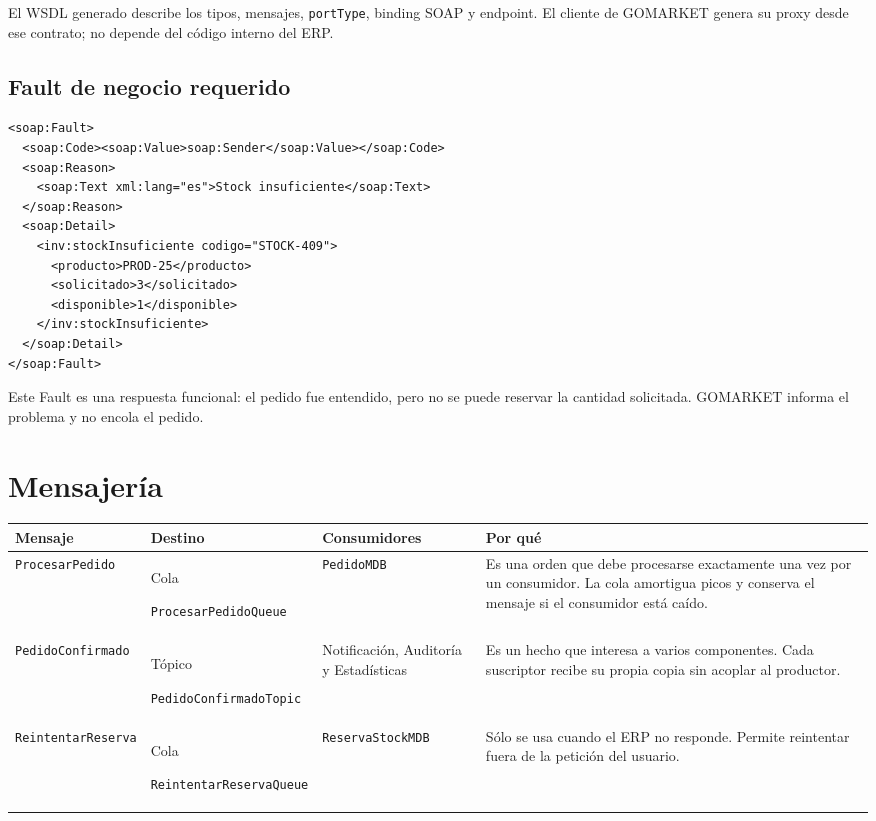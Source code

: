 \documentclass[11pt,a4paper]{article}
\begin{document}
El WSDL generado describe los tipos, mensajes, \texttt{portType}, binding SOAP y
endpoint. El cliente de GOMARKET genera su proxy desde ese contrato; no depende
del código interno del ERP.

\newpage
\subsection{Fault de negocio requerido}

\begin{Verbatim}[frame=single,framesep=7pt,rulecolor=\color{linegray},fontsize=\small]
<soap:Fault>
  <soap:Code><soap:Value>soap:Sender</soap:Value></soap:Code>
  <soap:Reason>
    <soap:Text xml:lang="es">Stock insuficiente</soap:Text>
  </soap:Reason>
  <soap:Detail>
    <inv:stockInsuficiente codigo="STOCK-409">
      <producto>PROD-25</producto>
      <solicitado>3</solicitado>
      <disponible>1</disponible>
    </inv:stockInsuficiente>
  </soap:Detail>
</soap:Fault>
\end{Verbatim}

Este Fault es una respuesta funcional: el pedido fue entendido, pero no se puede
reservar la cantidad solicitada. GOMARKET informa el problema y no encola el pedido.

\section{Mensajería}

\small
\begin{tabularx}{\textwidth}{@{}>{\raggedright\arraybackslash}p{2.95cm} >{\raggedright\arraybackslash}p{3.2cm} >{\raggedright\arraybackslash}p{2.8cm} X@{}}
\toprule
\textbf{Mensaje} & \textbf{Destino} & \textbf{Consumidores} & \textbf{Por qué} \\
\midrule
\texttt{ProcesarPedido} & Cola\par{\scriptsize\texttt{ProcesarPedidoQueue}} & \texttt{PedidoMDB} & Es una orden que debe procesarse exactamente una vez por un consumidor. La cola amortigua picos y conserva el mensaje si el consumidor está caído. \\
\addlinespace
\texttt{PedidoConfirmado} & Tópico\par{\scriptsize\texttt{PedidoConfirmadoTopic}} & Notificación, Auditoría y Estadísticas & Es un hecho que interesa a varios componentes. Cada suscriptor recibe su propia copia sin acoplar al productor. \\
\addlinespace
\texttt{ReintentarReserva} & Cola\par{\scriptsize\texttt{ReintentarReservaQueue}} & \texttt{ReservaStockMDB} & Sólo se usa cuando el ERP no responde. Permite reintentar fuera de la petición del usuario. \\
\bottomrule
\end{tabularx}
\normalsize
\end{document}
